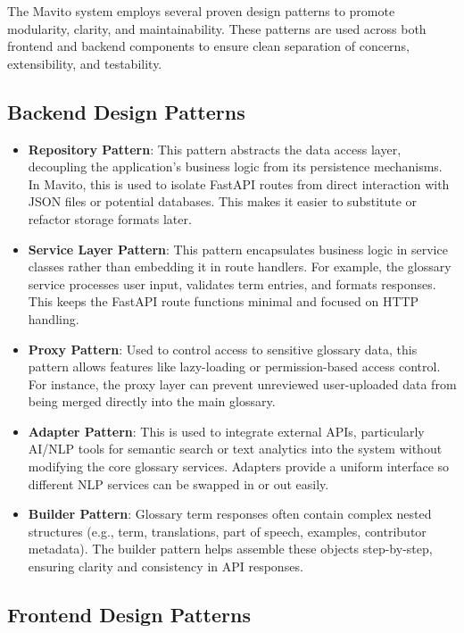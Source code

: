 \documentclass[12pt]{article}
\begin{document}
The Mavito system employs several proven design patterns to promote modularity, clarity, and maintainability. These patterns are used across both frontend and backend components to ensure clean separation of concerns, extensibility, and testability.

\subsection{Backend Design Patterns}

\begin{itemize}
    \item \textbf{Repository Pattern}: This pattern abstracts the data access layer, decoupling the application’s business logic from its persistence mechanisms. In Mavito, this is used to isolate FastAPI routes from direct interaction with JSON files or potential databases. This makes it easier to substitute or refactor storage formats later.

    \item \textbf{Service Layer Pattern}: This pattern encapsulates business logic in service classes rather than embedding it in route handlers. For example, the glossary service processes user input, validates term entries, and formats responses. This keeps the FastAPI route functions minimal and focused on HTTP handling.

    \item \textbf{Proxy Pattern}: Used to control access to sensitive glossary data, this pattern allows features like lazy-loading or permission-based access control. For instance, the proxy layer can prevent unreviewed user-uploaded data from being merged directly into the main glossary.

    \item \textbf{Adapter Pattern}: This is used to integrate external APIs, particularly AI/NLP tools for semantic search or text analytics into the system without modifying the core glossary services. Adapters provide a uniform interface so different NLP services can be swapped in or out easily.

    \item \textbf{Builder Pattern}: Glossary term responses often contain complex nested structures (e.g., term, translations, part of speech, examples, contributor metadata). The builder pattern helps assemble these objects step-by-step, ensuring clarity and consistency in API responses.
\end{itemize}

\subsection{Frontend Design Patterns}
\end{document}
